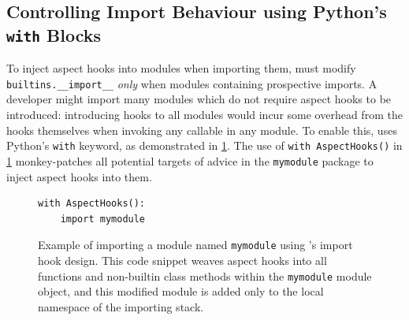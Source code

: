 \subsection{Controlling Import Behaviour using Python's \lstinline{with} Blocks}
\label{pdsf3implementingimporthooks}

To inject aspect hooks into modules when importing them, \pdsf{} must modify
\lstinline{builtins.__import__} \emph{only} when modules containing prospective
imports. A developer might import many modules which do not require aspect hooks
to be introduced: introducing hooks to all modules would incur some overhead
from the hooks themselves when invoking any callable in any module. To enable
this, \pdsf{} uses Python's \lstinline{with} keyword, as demonstrated in
\cref{fig:simple_aspect_hook_weaving_example}. The use of
\lstinline{with AspectHooks()} in \cref{fig:simple_aspect_hook_weaving_example} monkey-patches
all potential targets of advice in the \lstinline{mymodule} package to inject
aspect hooks into them.

\begin{figure}
    \centering
    \begin{lstlisting}[style=footnotesize_python]
with AspectHooks():
    import mymodule
    \end{lstlisting}
    \caption{Example of importing a module named \lstinline{mymodule} using
    \pdsf{}'s import hook design. This code snippet weaves aspect hooks into all
    functions and non-builtin class methods within the \lstinline{mymodule}
    module object, and this modified module is added only to the local namespace
    of the importing stack.}
    \label{fig:simple_aspect_hook_weaving_example}
\end{figure}

